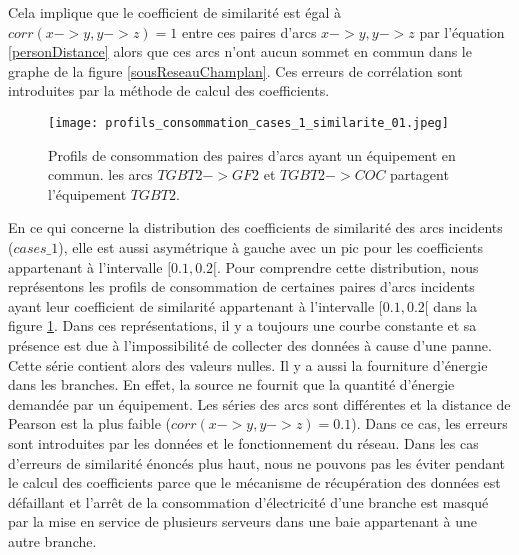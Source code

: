 	Cela implique que le coefficient de similarit\'e est \'egal \`a $corr(x->y,y->z) = 1$ entre ces paires d'arcs $x->y,y->z$ par l'\'equation \ref{personDistance} alors que ces arcs n'ont aucun sommet en commun dans le graphe de la figure \ref{sousReseauChamplan}.
	Ces erreurs de corr\'elation sont introduites par la m\'ethode de calcul des coefficients.
	\newline  
		\begin{figure}[htb!] 
		\centering
		\texttt{[image: profils\_consommation\_cases\_1\_similarite\_01.jpeg]}
		\caption{ Profils de consommation des paires d'arcs ayant un \'equipement en commun. 
		les arcs $TGBT2->GF2$ et $TGBT2->COC$ partagent l'\'equipement $TGBT2$.}
		\label{profils_consommation_cases_1_similarite_01}
		\end{figure}
	En ce qui concerne la distribution des coefficients de similarit\'e des arcs incidents ($cases\_1$), elle est aussi asym\'etrique \`a gauche avec un pic  pour les coefficients appartenant \`a l'intervalle $[0.1,0.2[$. Pour comprendre cette distribution, nous repr\'esentons les profils de consommation de certaines paires d'arcs incidents  ayant leur coefficient de similarit\'e appartenant \`a  l'intervalle $[0.1,0.2[$ dans la figure \ref{profils_consommation_cases_1_similarite_01}.  
	Dans ces repr\'esentations, il y a toujours une courbe constante et sa pr\'esence est due \`a l'impossibilit\'e de collecter des donn\'ees \`a cause d'une panne. 
	Cette s\'erie contient alors des valeurs nulles. Il y a aussi la fourniture d'\'energie dans les branches. En effet, la source ne fournit que la quantit\'e d'\'energie demand\'ee par un \'equipement. Les s\'eries des arcs sont diff\'erentes et la distance de Pearson est la plus faible ($corr(x->y,y->z) = 0.1$). 
	Dans ce cas, les erreurs sont introduites par les donn\'ees et le fonctionnement du r\'eseau.
\newline	
Dans les cas d'erreurs de similarit\'e \'enonc\'es plus haut, nous ne pouvons pas les \'eviter  pendant le calcul des coefficients parce que le m\'ecanisme de r\'ecup\'eration des donn\'ees est d\'efaillant et  l'arr\^et de la consommation d'\'electricit\'e d'une branche est masqu\'e par la mise en service de plusieurs serveurs dans une baie appartenant \`a une autre branche.
\newline 

